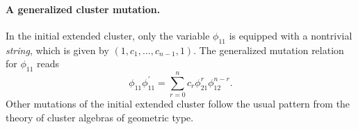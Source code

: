 \paragraph{A generalized cluster mutation.} In the initial extended cluster, only the variable $\phi_{11}$ is equipped with a nontrivial \emph{string}, which is given by $(1,c_1,\ldots,c_{n-1},1)$. The generalized mutation relation for $\phi_{11}$ reads
\begin{equation}\label{eq:p11mut}
\phi_{11} \phi_{11}^{\prime} = \sum_{r=0}^n c_r \phi_{21}^{r} \phi_{12}^{n-r}.
\end{equation}
Other mutations of the initial extended cluster follow the usual pattern from the theory of cluster algebras of geometric type.